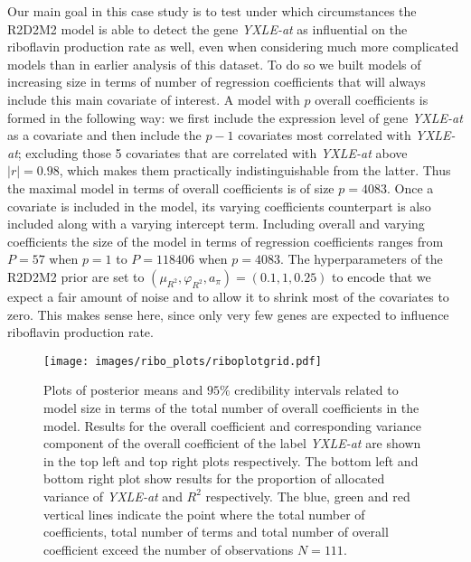 Our main goal in this case study is to test under which circumstances the R2D2M2 model is able to  detect the gene \textit{YXLE-at} as influential on the riboflavin production rate as well, even when considering much more complicated models than in earlier analysis of this dataset. To do so we built models of increasing size in terms of number of regression coefficients that will always include this main covariate of interest.  A model with $p$ overall coefficients is formed in the following way: we first include the expression level of gene \textit{YXLE-at} as a covariate and then include the $p-1$ covariates most correlated with \textit{YXLE-at}; excluding those 5 covariates that are correlated with \textit{YXLE-at} above $|r| = 0.98$, which makes them practically indistinguishable from the latter. Thus the maximal model in terms of overall coefficients is of size $p=4083$. Once a covariate is included in the model, its varying coefficients counterpart is also included along with a varying intercept term. Including overall and varying coefficients the size of the model in terms of regression coefficients ranges from $P = 57$ when $p=1$ to $P = 118406$ when $p=4083$.  The hyperparameters of the R2D2M2 prior are set to $(\mu_{R^2}, \varphi_{R^2} , a_\pi )= (0.1,1,0.25)$ to encode that we expect a fair amount of noise and to allow it to shrink most of the covariates to zero. This makes sense here, since only very few genes are expected to influence riboflavin production rate.
 \begin{figure}[t!]%
	\centering
	\texttt{[image: images/ribo\_plots/riboplotgrid.pdf]}
	\caption{Plots of posterior means and $95\%$ credibility intervals related to model size in terms of the total number of overall coefficients in the model. Results for the overall coefficient and corresponding variance component of the overall coefficient of the label \textit{YXLE-at} are shown in the top left and top right plots respectively. The bottom left and bottom right plot show results for the proportion of allocated variance of \textit{YXLE-at} and $R^2$ respectively. The blue, green and red vertical lines indicate the point where the total number of coefficients, total number of terms and total number of overall coefficient exceed the number of observations $N=111$. }
	\label{fig:ribo-grid}
\end{figure}


